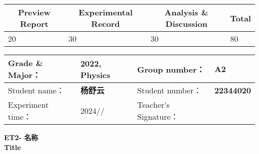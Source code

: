 


\begin{table}
	\renewcommand\arraystretch{1.7}
	\begin{tabularx}{\textwidth}{
			|X|X|X|X
			|X|X|X|X|}
		\hline
		\multicolumn{2}{|c|}{Preview Report}&\multicolumn{2}{|c|}{Experimental Record}&\multicolumn{2}{|c|}{Analysis \& Discussion}&\multicolumn{2}{|c|}{\Large\textbf{Total}}\\
		\hline
		\LARGE20 & & \LARGE30 & & \LARGE30 & & \LARGE80 & \\
		\hline
	\end{tabularx}
\end{table}


\begin{table}
	\renewcommand\arraystretch{1.7}
	\begin{tabularx}{\textwidth}{|X|X|X|X|}
		\hline
		Grade \& Major： & 2022, Physics &Group number： & A2\\
		\hline
		Student name： & \textbf{杨舒云}  & Student number： & \textbf{22344020}\\
		\hline
		Experiment time： & 2024// & Teacher's Signature： & \\
		\hline
	\end{tabularx}
\end{table}


\begin{center}
	\Huge \textbf{ET2- \quad 名称\\Title}
\end{center}


